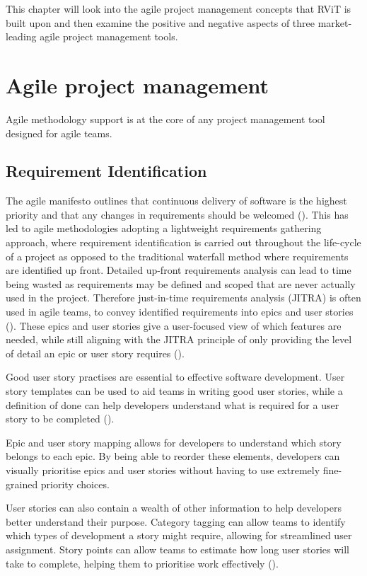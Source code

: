 \documentclass[l4proj.tex]{subfiles}
\begin{document}
    

This chapter will look into the agile project management concepts that RViT is built upon and then examine the positive and negative aspects of three market-leading agile project management tools.

\section{Agile project management}
Agile methodology support is at the core of any project management tool designed for agile teams.

\subsection{Requirement Identification}
The agile manifesto outlines that continuous delivery of software is the highest priority and that any changes in requirements should be welcomed (\cite{Kent2001(manifesto)}). This has led to agile methodologies adopting a lightweight requirements gathering approach, where requirement identification is carried out throughout the life-cycle of a project as opposed to the traditional waterfall method where requirements are identified up front. Detailed up-front requirements analysis can lead to time being wasted as requirements may be defined and scoped that are never actually used in the project. Therefore just-in-time requirements analysis (JITRA) is often used in agile teams, to convey identified requirements into epics and user stories (\cite{Schon2017}). These epics and user stories give a user-focused view of which features are needed, while still aligning with the JITRA principle of only providing the level of detail an epic or user story requires (\cite{BHOWMIK2019}).

Good user story practises are essential to effective software development. User story templates can be used to aid teams in writing good user stories, while a definition of done can help developers understand what is required for a user story to be completed (\cite{Silva2017}).

Epic and user story mapping allows for developers to understand which story belongs to each epic. By being able to reorder these elements, developers can visually prioritise epics and user stories without having to use extremely fine-grained priority choices.

User stories can also contain a wealth of other information to help developers better understand their purpose. Category tagging can allow teams to identify which types of development a story might require, allowing for streamlined user assignment. Story points can allow teams to estimate how long user stories will take to complete, helping them to prioritise work effectively (\cite{Coelho2012}). 
\end{document}
